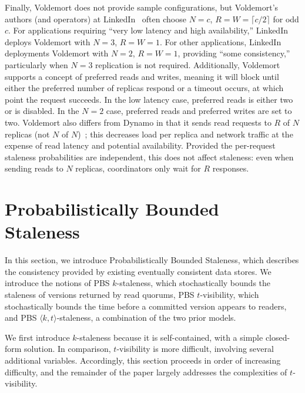 \documentclass{vldb}
\newcommand{\sectionskip}{-0em}
\begin{document}
 Finally, Voldemort does not provide sample configurations, but
 Voldemort's authors (and operators) at LinkedIn~\cite{feinbergpc}
 often choose $N$$=$$c$, $R$$=$$W$$=$$ \lceil c/2 \rceil$ for odd $c$.
 For applications requiring ``very low latency and high
 availability,'' LinkedIn deploys Voldemort with $N$$=$$3$,
 $R$$=$$W$$=$$1$.  For other applications, LinkedIn deployments
 Voldemort with $N$$=$$2$, $R$$=$$W$$=$$1$, providing ``some
 consistency,'' particularly when $N$$=$$3$ replication is not
 required.  Additionally, Voldemort supports a concept of preferred
 reads and writes, meaning it will block until either the preferred
 number of replicas respond or a timeout occurs, at which point the
 request succeeds.  In the low latency case, preferred reads is either
 two or is disabled.  In the $N$$=$$2$ case, preferred reads and
 preferred writes are set to two.  Voldemort also differs from Dynamo
 in that it sends read requests to $R$ of $N$ replicas (not $N$ of
 $N$)~\cite{voldemortpub}; this decreases load per replica and network
 traffic at the expense of read latency and potential availability.
 Provided the per-request staleness probabilities are independent,
 this does not affect staleness: even when sending reads to
 $N$ replicas, coordinators only wait for $R$ responses.


\vspace{\sectionskip}\section{Probabilistically Bounded\\Staleness}
\label{sec:pbs}

In this section, we introduce Probabilistically Bounded Staleness,
which describes the consistency provided by existing eventually
consistent data stores.  We introduce the notions of PBS
$k$-staleness, which stochastically bounds the staleness of versions
returned by read quorums, PBS $t$-visibility, which stochastically
bounds the time before a committed version appears to readers, and PBS
$\langle k, t \rangle$-staleness, a combination of the two prior
models.

We first introduce $k$-staleness because it is self-contained, with a
simple closed-form solution.  In comparison, $t$-visibility is more
difficult, involving several additional variables.  Accordingly, this
section proceeds in order of increasing difficulty, and the remainder
of the paper largely addresses the complexities of $t$-visibility.
\end{document}
